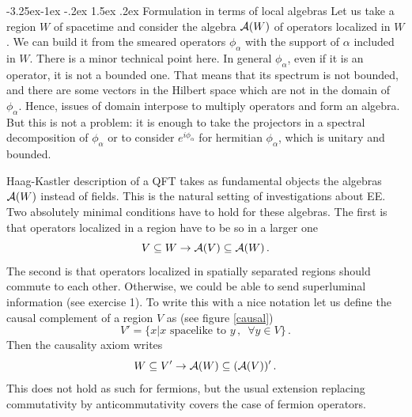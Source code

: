 \documentclass[11pt]{article}
\makeatletter
\renewcommand\subsection{\@startsection{subsection}{2}{\z@}%
                                   {-3.25ex\@plus -1ex \@minus -.2ex}%
                                     {1.5ex \@plus .2ex}%
                                     {\normalfont\bfseries}}
\numberwithin{equation}{section}
\newcommand{\be}{\begin{equation}}
\newcommand{\ee}{\end{equation}}
\makeatother
\begin{document}
\subsection{Formulation in terms of local algebras}
Let us take a region $W$ of spacetime and consider the algebra ${\cal A}(W)$ of operators localized in $W$. We can build it from the smeared operators $\phi_\alpha$ with the support of $\alpha$ included in $W$. There is a minor technical point here. In general $\phi_\alpha$, even if it is an operator, it is not a bounded one. That means that its spectrum is not bounded, and there are some vectors in the Hilbert space which are not in the domain of $\phi_\alpha$. Hence, issues of domain interpose to multiply operators and form an algebra. But this is not a problem: it is enough to take the projectors in a spectral decomposition of $\phi_\alpha$ or to consider $e^{i \phi_\alpha}$ for hermitian $\phi_\alpha$, which is unitary and bounded. 

 

Haag-Kastler description of a QFT takes as fundamental objects the algebras ${\cal A}(W)$ instead of fields. This is the natural setting of investigations about EE. Two absolutely minimal conditions have to hold for these algebras. The first is that operators localized in a region have to be so in a larger one   
\be
V\subseteq W\rightarrow  {\cal A}(V) \subseteq {\cal A}(W)\,.
\ee
The second is that operators localized in spatially separated regions should commute to each other. Otherwise, we could be able to send superluminal information (see exercise 1). To write this with a nice notation let us define the causal complement of a region $V$ as (see figure \ref{causal})
\be
V'=\{x | x \,\,\textrm{spacelike to }y\,, \,\,\, \forall y \in V\}\,.  
\ee
Then the causality axiom writes 
\be
W\subseteq V'\rightarrow {\cal A}(W)\subseteq ({\cal A}(V))'\,.
\ee
This does not hold as such for fermions, but the usual extension replacing commutativity by anticommutativity covers the case of fermion operators.  
\end{document}
